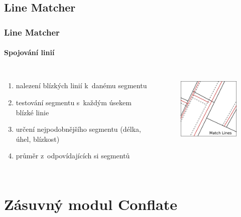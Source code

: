 \documentclass[unicode,bookmarksnumbered]{beamer}
\begin{document}
  \subsection{Line Matcher} %
  \begin{frame}
  \frametitle{Line Matcher}
    \framesubtitle{Spojování linií}
     \begin{columns}[c]
	\column{2in}
	\begin{enumerate}
	    \item nalezení blízkých linií k~danému segmentu
	    \item testování segmentu s~každým úsekem blízké linie
	    \item určení nejpodobnějšího segmentu
		  (délka, úhel, blízkost) 
	    \item průměr z~odpovídajících si segmentů
	\end{enumerate}
	\column{2in}
	  \begin{figure}
	  \centering
             \includegraphics[width=1.5in]{./pictures/match.pdf}
	  \label{fig:lm-princip}
	  \end{figure}
      \end{columns}
  \end{frame}


\section{Zásuvný modul Conflate}   %
\end{document}
